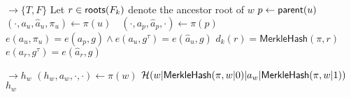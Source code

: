 \begin{algorithm}[H]
\begin{algorithmic}[1]
     $\rightarrow \{T,F\}$ 
        \State Let $r\in \mathsf{roots}(F_k)$ denote the ancestor root of $w$
            \State $p \gets \mathsf{parent}(u)$
            \State $(\cdot, a_{u}, \hat{a}_{u}, \pi_{u}) \gets \pi(u)\quad(\cdot, a_{p}, \hat{a}_{p}, \cdot) \gets \pi(p)$
            \Assert $e(a_u, \pi_u) = e(a_p, g) \wedge e(a_u, g^\tau) = e(\hat{a}_u, g)$
            \label{a:aas:verpath:extractability-check}
        \EndFor
        \Assert $d_k(r) = \mathsf{MerkleHash}(\pi, r)$ 
        \label{a:aas:verpath:merklehash}
        \Assert $e(a_r, g^\tau) = e(\hat{a}_r, g)$

    \EndFunction
     $\rightarrow h_w$
    \label{a:aas:merklehash}
        \State $(h_w, a_w, \cdot,\cdot) \gets \pi(w)$
            \State \Return $\mathcal{H}(w|\mathsf{MerkleHash}(\pi, w|0)|a_w|\mathsf{MerkleHash}(\pi, w|1))$
        \Else
            \State \Return $h_w$
        \EndIf
    \EndFunction
    \end{algorithmic}
\end{algorithm}

